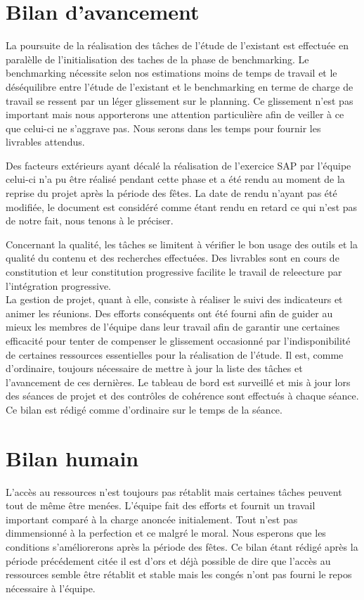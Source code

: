 
\section{Bilan d'avancement}

La poursuite de la réalisation des tâches de l'étude de l'existant est effectuée en paralèlle de l'initialisation des taches de la phase de benchmarking. Le benchmarking nécessite selon nos estimations moins de temps de travail et le déséquilibre entre l'étude de l'existant et le benchmarking en terme de charge de travail se ressent par un léger glissement sur le planning. Ce glissement n'est pas important mais nous apporterons une attention particulière afin de veiller à ce que celui-ci ne s'aggrave pas. Nous serons dans les temps pour fournir les livrables attendus.

Des facteurs extérieurs ayant décalé la réalisation de l'exercice SAP par l'équipe celui-ci n'a pu être réalisé pendant cette phase et a été rendu au moment de la reprise du projet après la période des fêtes. La date de rendu n'ayant pas été modifiée, le document est considéré comme étant rendu en retard ce qui n'est pas de notre fait, nous tenons à le préciser.

Concernant la qualité, les tâches se limitent à vérifier le bon usage des outils et la qualité du contenu et des recherches effectuées. Des livrables sont en cours de constitution et leur constitution progressive facilite le travail de releecture par l'intégration progressive. \\

La gestion de projet, quant à elle, consiste à réaliser le suivi des indicateurs et animer les réunions. Des efforts conséquents ont été fourni afin de guider au mieux les membres de l'équipe dans leur travail afin de garantir une certaines efficacité pour tenter de compenser le glissement occasionné par l'indisponibilité de certaines ressources essentielles pour la réalisation de l'étude. Il est, comme d'ordinaire, toujours nécessaire de mettre à jour la liste des tâches et l'avancement de ces dernières. Le tableau de bord est surveillé et mis à jour lors des séances de projet et des contrôles de cohérence sont effectués à chaque séance. Ce bilan est rédigé comme d'ordinaire sur le temps de la séance. \\

\section{Bilan humain}

L'accès au ressources n'est toujours pas rétablit mais certaines tâches peuvent tout de même être menées. L'équipe fait des efforts et fournit un travail important comparé à la charge anoncée initialement. Tout n'est pas dimmensionné à la perfection et ce malgré le moral. Nous esperons que les conditions s'améliorerons après la période des fêtes. Ce bilan étant rédigé après la période précédement citée il est d'ors et déjà possible de dire que l'accès au ressources semble être rétablit et stable mais les congés n'ont pas fourni le repos nécessaire à l'équipe.
